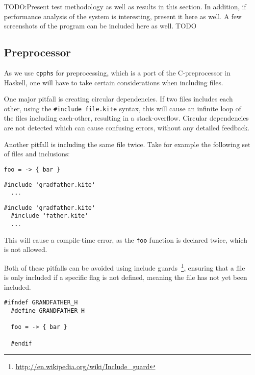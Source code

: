 
TODO:Present test methodology as well as results in this section. In addition, if performance
analysis of the system is interesting, present it here as well.
A few screenshots of the program can be included here as well. TODO


\subsection{Preprocessor}
As we use \texttt{cpphs}\cite{wallace04} for preprocessing, which is a
port of the C-preprocessor in Haskell, one will have to take certain
considerations when including files.

One major pitfall is creating circular dependencies. If two files includes
each other, using the \texttt{\#include file.kite} syntax, this will
cause an infinite loop of the files including each-other, resulting in
a stack-overflow. Circular dependencies are not detected which can
cause confusing errors, without any detailed feedback.

Another pitfall is including the same file twice. Take for example the
following set of files and inclusions:

\begin{lstlisting}[caption=\texttt{grandfather.kite}]
  foo = -> { bar }
\end{lstlisting}

\begin{lstlisting}[caption=\texttt{father.kite}]
  #include 'gradfather.kite'
  ...
\end{lstlisting}

\begin{lstlisting}[caption=\texttt{child.kite}]
  #include 'gradfather.kite'
  #include 'father.kite'
  ...
\end{lstlisting}

This will cause a compile-time error, as the \texttt{foo} function is
declared twice, which is not allowed.

Both of these pitfalls can be avoided using include
guards~\footnote{\url{http://en.wikipedia.org/wiki/Include_guard}},
ensuring that a file is only included if a specific flag is not
defined, meaning the file has not yet been included.

\begin{lstlisting}[caption=\texttt{grandfather.kite}]
  #ifndef GRANDFATHER_H
  #define GRANDFATHER_H

  foo = -> { bar }

  #endif
\end{lstlisting}

